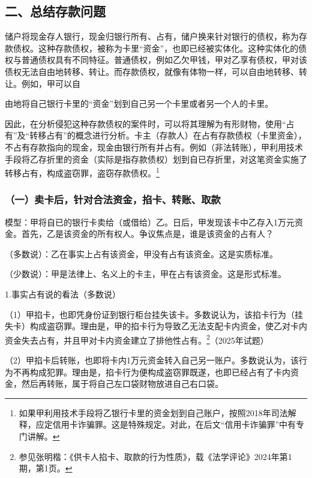 \subsection*{二、总结存款问题}

储户将现金存人银行，现金归银行所有、占有，储户换来针对银行的债权，称为存款债权。这种存款债权，被称为卡里“资金”，也即已经被实体化。这种实体化的债权与普通债权具有不同特征。普通债权，例如乙欠甲钱，甲对乙享有债权，甲对该债权无法自由地转移、转让。而存款债权，就像有体物一样，可以自由地转移、转让。例如，甲可以自

由地将自己银行卡里的“资金”划到自己另一个卡里或者另一个人的卡里。

因此，在分析侵犯这种存款债权的案件时，可以将其理解为有形财物，使用“占有”及“转移占有”的概念进行分析。卡主（存款人）在占有存款债权（卡里资金），不占有存款指向的现金，现金由银行所有并占有。例如（非法转账），甲利用技术手段将乙存折里的资金（实际是指存款债权）划到自已存折里，对这笔资金实施了转移占有，构成盗窃罪，盗窃存款债权。\footnote{如果甲利用技术手段将乙银行卡里的资金划到自己账户，按照2018年司法解释，应定信用卡诈骗罪。这是特殊规定。对此，在后文“信用卡诈骗罪”中有专门讲解。}

\subsubsection*{（一）卖卡后，针对合法资金，掐卡、转账、取款}

模型：甲将自已的银行卡卖给（或借给）乙。日后，甲发现该卡中乙存入1万元资金。首先，乙是该资金的所有权人。争议焦点是，谁是该资金的占有人？

（多数说）：乙在事实上占有该资金，甲没有占有该资金。这是实质标准。

（少数说）：甲是法律上、名义上的卡主，甲在占有该资金。这是形式标准。

1.事实占有说的看法（多数说）

（1）甲掐卡，也即凭身份证到银行柜台挂失该卡。多数说认为，该掐卡行为（挂失卡）构成盗窃罪。理由是，甲的掐卡行为导致乙无法支配卡内资金，使乙对卡内资金失去占有，并且甲对卡内资金建立了排他性占有。\footnote{参见张明楷：《供卡人掐卡、取款的行为性质》，载《法学评论》2024年第1期，第1页。}（2025年试题）

（2）甲掐卡后转账，也即将卡内1万元资金转入自己另一账户。多数说认为，该行为不再构成犯罪。理由是，掐卡行为便构成盗窃罪既遂，也即已经占有了卡内资金，然后再转账，属于将自己左口袋财物放进自己右口袋。

